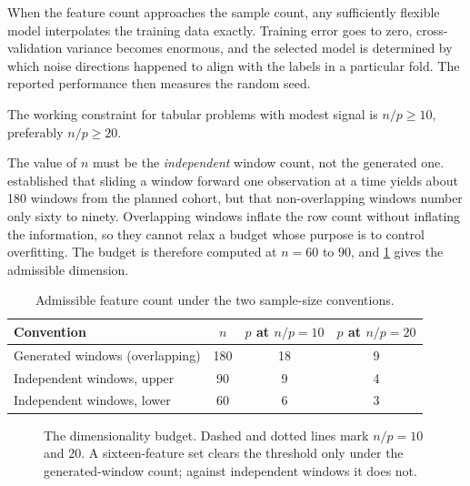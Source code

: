 \documentclass[12pt,a4paper,oneside]{report}
\begin{document}
When the feature count approaches the sample count, any sufficiently flexible model interpolates the training data exactly. Training error goes to zero, cross-validation variance becomes enormous, and the selected model is determined by which noise directions happened to align with the labels in a particular fold. The reported performance then measures the random seed.

The working constraint for tabular problems with modest signal is $n/p \geq 10$, preferably $n/p \geq 20$.

The value of $n$ must be the \emph{independent} window count, not the generated one.  established that sliding a window forward one observation at a time yields about 180 windows from the planned cohort, but that non-overlapping windows number only sixty to ninety. Overlapping windows inflate the row count without inflating the information, so they cannot relax a budget whose purpose is to control overfitting. The budget is therefore computed at $n = 60$ to $90$, and \cref{tab:np-budget} gives the admissible dimension.

\begin{table}[htbp]
\centering\small
\caption{Admissible feature count under the two sample-size conventions.}\label{tab:np-budget}
\begin{tabularx}{\textwidth}{@{}X c c c@{}}
\toprule
\textbf{Convention} & \textbf{$n$} & \textbf{$p$ at $n/p = 10$} & \textbf{$p$ at $n/p = 20$} \\
\midrule
Generated windows (overlapping) & 180 & 18 & 9 \\
Independent windows, upper & 90 & 9 & 4 \\
Independent windows, lower & 60 & 6 & 3 \\
\bottomrule
\end{tabularx}
\end{table}

\begin{figure}[htbp]
\centering
{}
\caption{The dimensionality budget. Dashed and dotted lines mark $n/p = 10$ and $20$. A sixteen-feature set clears the threshold only under the generated-window count; against independent windows it does not.}\label{fig:np-budget}
\end{figure}
\end{document}
